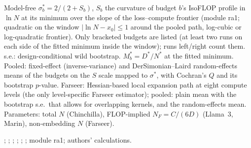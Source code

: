 \begin{table}[tp]
\begin{tablenotes}
Model-free $\sigma^*_b=2/(2+S_b)$, $S_b$ the curvature of budget $b$'s IsoFLOP profile in $\ln N$ at its minimum over the slope of the loss--compute frontier (module ra1; quadratic on the window $|\ln N-x_0|\le1$ around the pooled path, log-cubic or log-quadratic frontier). Only bracketed budgets are listed (at least two runs on each side of the fitted minimum inside the window); runs left/right count them. s.e.: design-conditional wild bootstrap. $M^*_b=D^*/N^*$ at the fitted minimum. Pooled: fixed-effect (inverse-variance) and DerSimonian--Laird random-effects means of the budgets on the $S$ scale mapped to $\sigma^*$, with Cochran's $Q$ and its bootstrap $p$-value. Farseer: Hessian-based local expansion path at eight compute levels (the only level-specific Farseer estimator); pooled: plain mean with the bootstrap s.e.\ that allows for overlapping kernels, and the random-effects mean. Parameters: total $N$ (Chinchilla), FLOP-implied $N_F=C/(6D)$ (Llama~3, Marin), non-embedding $N$ (Farseer).
\end{tablenotes}

\begin{tablenotes}[Source]
\citet{hoffmann2022training}; \citet{besiroglu2024chinchilla}; \citet{grattafiori2024llama}; \citet{czech2026llama3isoflop}; \citet{marin2026ladders}; \citet{li2025predictableb}; module ra1; authors' calculations.
\end{tablenotes}
\end{table}
